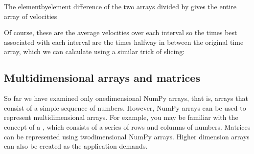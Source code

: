\documentclass[letterpaper,10pt,english]{sphinxmanual}
\begin{document}
\sphinxAtStartPar
The element\sphinxhyphen{}by\sphinxhyphen{}element difference of the two arrays  divided by  gives the entire array of velocities

\begin{sphinxVerbatim}[commandchars=\\\{\},numbers=left,firstnumber=1,stepnumber=1]
  \PYG{p}{[}\PYG{p}{]}\PYG{p}{[}\PYG{p}{]}\PYG{p}{[}\PYG{p}{]}\PYG{p}{[}\PYG{p}{]}

\PYG{p}{[}              
\PYG{g+go}{                13.79310345,  20.85106383,  17.38461538])}
\end{sphinxVerbatim}

\sphinxAtStartPar
Of course, these are the average velocities over each interval so the times best associated with each interval are the times halfway in between the original time array, which we can calculate using a similar trick of slicing:

\begin{sphinxVerbatim}[commandchars=\\\{\}]
  \PYG{p}{[}\PYG{p}{]}\PYG{p}{[}\PYG{p}{]}

\PYG{p}{[}             \PYG{p}{]}
\end{sphinxVerbatim}


\subsection{Multi\sphinxhyphen{}dimensional arrays and matrices}
\label{\detokenize{chap3/chap3_arrays:multi-dimensional-arrays-and-matrices}}
\sphinxAtStartPar
So far we have examined only one\sphinxhyphen{}dimensional NumPy arrays, that is, arrays that consist of a simple sequence of numbers.   However, NumPy arrays can be used to represent multidimensional arrays.   For example, you may be familiar with the concept of a , which consists of a series of rows and columns of numbers.  Matrices can be represented using two\sphinxhyphen{}dimensional NumPy arrays.  Higher dimension arrays can also be created as the application demands.
\end{document}
